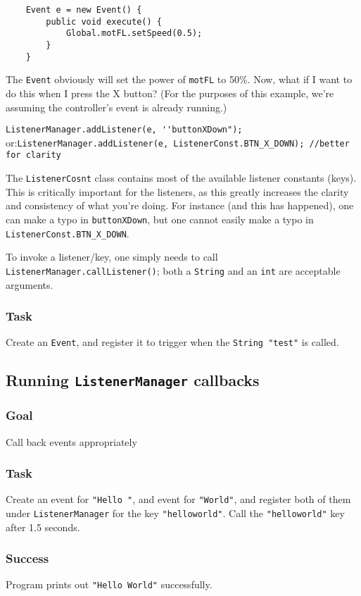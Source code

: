 \documentclass[a4paper]{article}
\begin{document}
\begin{lstlisting}
	Event e = new Event() {
		public void execute() {
			Global.motFL.setSpeed(0.5);
		}
	}
\end{lstlisting}

The \lstinline{Event} obviously will set the power of \lstinline{motFL} to 50\%. Now, what if I want to do this when I press the X button? (For the purposes of this example, we're assuming the controller's event is already running.)

\lstinline{ListenerManager.addListener(e, ''buttonXDown");} or:\newline\indent\lstinline{ListenerManager.addListener(e, ListenerConst.BTN_X_DOWN); //better for clarity}

The \lstinline{ListenerCosnt} class contains most of the available listener constants (keys). This is critically important for the listeners, as this greatly increases the clarity and consistency of what you're doing. For instance (and this has happened), one can make a typo in \lstinline{buttonXDown}, but one cannot easily make a typo in \lstinline{ListenerConst.BTN_X_DOWN}.

To invoke a listener/key, one simply needs to call \lstinline{ListenerManager.callListener()}; both a \lstinline{String} and an \lstinline{int} are acceptable arguments.
\subsubsection{Task} Create an \lstinline{Event}, and register it to trigger when the \lstinline{String "test"} is called.

\pagebreak\subsection{Running \lstinline{ListenerManager} callbacks}
\subsubsection{Goal} Call back events appropriately
\setcounter{subsubsection}{2}\subsubsection{Task} Create an event for \lstinline{"Hello "}, and event for \lstinline{"World"}, and register both of them under \lstinline{ListenerManager} for the key \lstinline{"helloworld"}. Call the \lstinline{"helloworld"} key after 1.5 seconds.
\subsubsection{Success} Program prints out \lstinline{"Hello World"} successfully.
\end{document}
